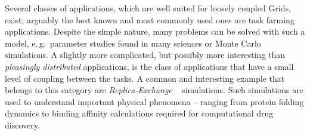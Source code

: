 \documentclass[times, 10pt, twocolumn]{article}
\newcommand{\kimnote}[1]{ {\textcolor{green} { ***JK: #1 }}}
\newcommand{\jhanote}[1]{ {\textcolor{red} { ***SJ: #1 }}}
\newcommand{\kimnote}[1]{}
\newcommand{\jhanote}[1]{}
\begin{document}
\begin{abstract}
\end{abstract}

                           
Several classes of applications, which are well suited for loosely
coupled Grids, exist; arguably the best known and most commonly used
ones are task farming applications. Despite the simple nature, many
problems can be solved with such a model, e.\,g.\ parameter studies
found in many sciences or Monte Carlo simulations. A slightly more
complicated, but possibly more interesting than {\it pleasingly
  distributed} applications, is the class of applications that have a
small level of coupling between the tasks.
A common and interesting example that belongs to this category are
\emph{Replica-Exchange }~\cite{hansmann,Sugita:1999rm} simulations.
Such simulations are used to understand important physical phenomena
-- ranging from protein folding dynamics to binding affinity
calculations required for computational drug discovery.

  

              
\end{document}

